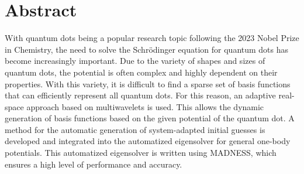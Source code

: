 \chapter*{Abstract}

With quantum dots being a popular research topic following the 2023 Nobel Prize in Chemistry, the need to solve the Schrödinger equation for quantum dots has become increasingly important. 
Due to the variety of shapes and sizes of quantum dots, the potential is often complex and highly dependent on their properties. 
With this variety, it is difficult to find a sparse set of basis functions that can efficiently represent all quantum dots. 
For this reason, an adaptive real-space approach based on multiwavelets is used.
This allows the dynamic generation of basis functions based on the given potential of the quantum dot.
A method for the automatic generation of system-adapted initial guesses is developed and integrated into the automatized eigensolver for general one-body potentials.
This automatized eigensolver is written using MADNESS, which ensures a high level of performance and accuracy.